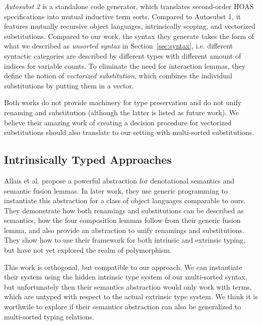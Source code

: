 \documentclass[a4paper, UKenglish, cleveref, autoref, thm-restate]{lipics-v2021}
\begin{document}
  \emph{Autosubst 2}\cite{DBLP:conf/cpp/StarkSK19} is a standalone
  code generator, which translates second-order HOAS specifications into
  mutual inductive term sorts. Compared to Autosubst 1, it features
  mutually recursive object languages, intrinsically scoping, and
  vectorized substitutions.
  Compared to our work, the syntax they generate takes the form of
  what we described as \emph{unsorted syntax} in
  Section~\ref{sec:syntax}, i.e. different syntactic categories are
  described by different types with different amount of indices for
  variable counts. To eliminate the need for interaction lemmas, they
  define the notion of \emph{vectorized substitution}, which combines
  the individual substitutions by putting them in a vector.
  
  Both works do not provide machinery for type preservation and do not
  unify renaming and substitution (although the latter is listed as
  future work). We believe their amazing work of creating a decision
  procedure for vectorized substitutions should also translate to our
  setting with multi-sorted substitutions.


  \subsection{Intrinsically Typed Approaches}

  Allais et al.\cite{DBLP:conf/cpp/Allais0MM17} propose a powerful
  abstraction for denotational semantics and semantic fusion lemmas.
  In later work\cite{DBLP:journals/pacmpl/AllaisA0MM18}, they use
  generic programming to instantiate this abstraction for a class of
  object languages comparable to ours.
  They demonstrate how both renamings and substitutions can be
  described as semantics, how the four composition lemmas follow from
  their generic fusion lemma, and also provide an abstraction to unify
  renamings and substitutions.
  They show how to use their framework for both intrinsic and
  extrinsic typing, but have not yet explored the realm of polymorphism.

  This work is orthogonal, but compatible to our approach.
  We can instantiate their system using the hidden intrinsic type
  system of our multi-sorted syntax, but unfortunately then their
  semantics abstraction would only work with terms, which are untyped
  with respect to the actual extrinsic type system.
  We think it is worthwile to explore if their semantics abstraction
  can also be generalized to multi-sorted typing relations.
\end{document}
